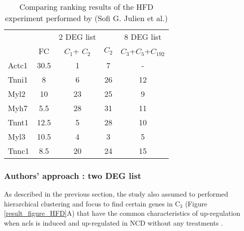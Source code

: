 \documentclass[oneside,phd]{snuthesis}
\begin{document}
\begin{table}
\centering
\begin{tabular}{l || cccc} 
\hline
     & & 2 DEG list && 8 DEG list             \\
      & FC         & $C_1$+ $C_2$      & $C_2$ & $C_3$+$C_5$+$C_{192}$ \\
\hline
Actc1 & 30.5       & 1          & 7  & -          \\
Tnni1 & 8          & 6          & 26 & 12         \\
Myl2  & 10         & 23         & 25 & 9          \\
Myh7  & 5.5        & 28         & 31 & 11         \\
Tnnt1 & 12.5       & 5          & 28 & 10         \\
Myl3  & 10.5       & 4          & 3  & 5          \\
Tnnc1 & 8.5        & 20         & 24 & 15        \\ \hline
\end{tabular}
\caption{Comparing ranking results of the HFD experiment performed by (Sofi G. Julien et al.)}
\label{venndianet_table3}
\end{table}

\subsubsection{Authors' approach : two DEG list} 
As described in the previous section, the study also assumed to performed hierarchical clustering and focus to find certain genes in C$_{3}$ (Figure \ref{result_figure_HFD}A) that have the common characteristics of up-regulation when ncls is induced  and up-regulated in NCD without any treatments . 
\end{document}
